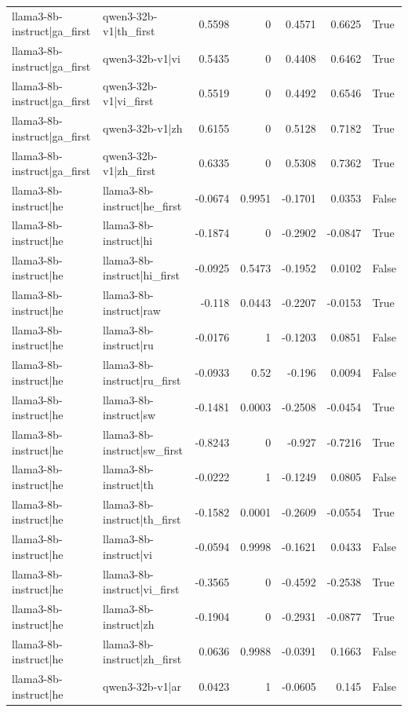 \begin{table}
\begin{tabular}{l l r r r r l}
llama3-8b-instruct|ga_first & qwen3-32b-v1|th_first & 0.5598 & 0 & 0.4571 & 0.6625 & True \\
llama3-8b-instruct|ga_first & qwen3-32b-v1|vi & 0.5435 & 0 & 0.4408 & 0.6462 & True \\
llama3-8b-instruct|ga_first & qwen3-32b-v1|vi_first & 0.5519 & 0 & 0.4492 & 0.6546 & True \\
llama3-8b-instruct|ga_first & qwen3-32b-v1|zh & 0.6155 & 0 & 0.5128 & 0.7182 & True \\
llama3-8b-instruct|ga_first & qwen3-32b-v1|zh_first & 0.6335 & 0 & 0.5308 & 0.7362 & True \\
llama3-8b-instruct|he & llama3-8b-instruct|he_first & -0.0674 & 0.9951 & -0.1701 & 0.0353 & False \\
llama3-8b-instruct|he & llama3-8b-instruct|hi & -0.1874 & 0 & -0.2902 & -0.0847 & True \\
llama3-8b-instruct|he & llama3-8b-instruct|hi_first & -0.0925 & 0.5473 & -0.1952 & 0.0102 & False \\
llama3-8b-instruct|he & llama3-8b-instruct|raw & -0.118 & 0.0443 & -0.2207 & -0.0153 & True \\
llama3-8b-instruct|he & llama3-8b-instruct|ru & -0.0176 & 1 & -0.1203 & 0.0851 & False \\
llama3-8b-instruct|he & llama3-8b-instruct|ru_first & -0.0933 & 0.52 & -0.196 & 0.0094 & False \\
llama3-8b-instruct|he & llama3-8b-instruct|sw & -0.1481 & 0.0003 & -0.2508 & -0.0454 & True \\
llama3-8b-instruct|he & llama3-8b-instruct|sw_first & -0.8243 & 0 & -0.927 & -0.7216 & True \\
llama3-8b-instruct|he & llama3-8b-instruct|th & -0.0222 & 1 & -0.1249 & 0.0805 & False \\
llama3-8b-instruct|he & llama3-8b-instruct|th_first & -0.1582 & 0.0001 & -0.2609 & -0.0554 & True \\
llama3-8b-instruct|he & llama3-8b-instruct|vi & -0.0594 & 0.9998 & -0.1621 & 0.0433 & False \\
llama3-8b-instruct|he & llama3-8b-instruct|vi_first & -0.3565 & 0 & -0.4592 & -0.2538 & True \\
llama3-8b-instruct|he & llama3-8b-instruct|zh & -0.1904 & 0 & -0.2931 & -0.0877 & True \\
llama3-8b-instruct|he & llama3-8b-instruct|zh_first & 0.0636 & 0.9988 & -0.0391 & 0.1663 & False \\
llama3-8b-instruct|he & qwen3-32b-v1|ar & 0.0423 & 1 & -0.0605 & 0.145 & False \\

\end{tabular}
\end{table}
